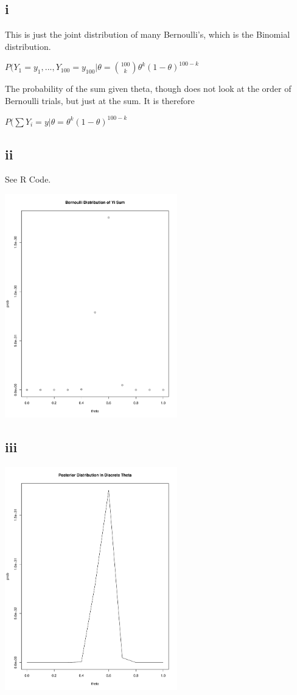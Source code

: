 \documentclass{article}
\begin{document}
\subsection{i}
This is just the joint distribution of many Bernoulli's, which is the Binomial distribution.

$P(Y_1=y_1,...,Y_{100}=y_{100}|\theta = {100 \choose k} \theta^k (1-\theta)^{100-k}$

The probability of the sum given theta, though does not look at the order of Bernoulli trials, but just at the sum. It is therefore

$P(\sum Y_i = y|\theta = \theta^k (1-\theta)^{100-k}$

\subsection{ii}
See R Code.

\includegraphics[width=75mm, scale=0.8]{5ii_plot.pdf}

\subsection{iii}
\includegraphics[width=75mm, scale=0.8]{5iiiplot.pdf}
\end{document}
